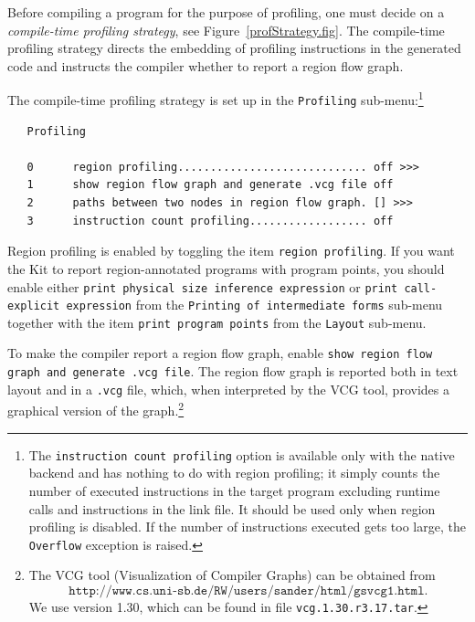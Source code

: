 \documentclass[12pt]{book}
\begin{document}
Before compiling a program for the purpose of profiling, one must decide on a
%
{\em compile-time profiling strategy}, see
Figure~\ref{profStrategy.fig}.  The compile-time profiling strategy
directs the embedding of profiling instructions in the generated code
and instructs the compiler whether to report a region flow graph.

The compile-time profiling strategy is set up in the 
%
{\tt Profiling} sub-menu:\footnote{The   
  \texttt{instruction count profiling} option is available only with the
  native backend and has nothing to do with region profiling; it simply
  counts the number of executed instructions in the target program
  excluding runtime calls and instructions in the link file. It should be used
  only when region profiling is disabled. If the number of instructions
  executed gets too large, the {\tt Overflow} exception is raised.}

\begin{verbatim}
   Profiling

   0      region profiling............................. off >>>
   1      show region flow graph and generate .vcg file off
   2      paths between two nodes in region flow graph. [] >>>
   3      instruction count profiling.................. off
\end{verbatim}
\noindent
Region profiling is enabled by toggling the item
%
\mbox{{\tt region profiling}}. If you want the Kit to report
region-annotated programs with program points, you should enable
either 
%
{\tt print physical size inference expression} or
%
{\tt print call-explicit expression} from the {\tt Printing of
  intermediate forms} sub-menu together with the item 
%
{\tt print program points} from the {\tt Layout} sub-menu.

To make the compiler report a region flow graph, enable
%
{\tt show region flow graph and generate .vcg file}. The region flow
graph is reported both in text layout and in a {\tt .vcg} file, which,
when interpreted by the 
%
VCG tool, provides a graphical version of the graph.\footnote{The VCG
  tool (Visualization of Compiler Graphs) can be obtained from
  \[\texttt{http://www.cs.uni-sb.de/RW/users/sander/html/gsvcg1.html}.\]
  We use version 1.30, which can be found in file
  \texttt{vcg.1.30.r3.17.tar}.}
\end{document}
